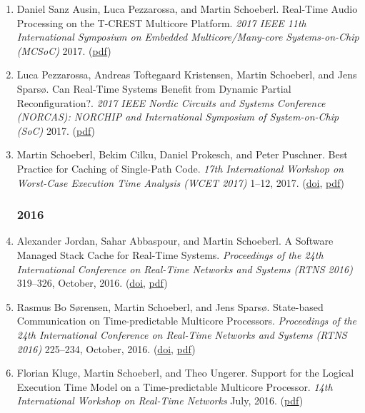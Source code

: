 \begin{enumerate}
\item Daniel Sanz Ausin, Luca Pezzarossa, and Martin Schoeberl.
 Real-Time Audio Processing on the T-CREST Multicore Platform.
 \emph{2017 IEEE 11th International Symposium on Embedded Multicore/Many-core Systems-on-Chip (MCSoC)} 2017.
(\href{http://www.jopdesign.com/doc/dspapp.pdf}{pdf})

\item Luca Pezzarossa, Andreas Toftegaard Kristensen, Martin Schoeberl, and Jens Spars{\o}.
 Can Real-Time Systems Benefit from Dynamic Partial Reconfiguration?.
 \emph{2017 IEEE Nordic Circuits and Systems Conference (NORCAS): NORCHIP and International Symposium of System-on-Chip (SoC)} 2017.
(\href{http://www.jopdesign.com/doc/dpr-mcp.pdf}{pdf})

\item Martin Schoeberl, Bekim Cilku, Daniel Prokesch, and Peter Puschner.
 Best Practice for Caching of Single-Path Code.
 \emph{17th International Workshop on Worst-Case Execution Time Analysis (WCET 2017)} 1--12, 2017.
(\href{http://dx.doi.org/10.4230/OASIcs.WCET.2017.2}{doi}, \href{http://www.jopdesign.com/doc/spcaching.pdf}{pdf})


\subsubsection*{2016}

\item Alexander Jordan, Sahar Abbaspour, and Martin Schoeberl.
 A Software Managed Stack Cache for Real-Time Systems.
 \emph{Proceedings of the 24th International Conference on Real-Time Networks and Systems (RTNS 2016)} 319--326, October, 2016.
(\href{http://dx.doi.org/10.1145/2997465}{doi}, \href{http://www.jopdesign.com/doc/swscache.pdf}{pdf})

\item Rasmus Bo S{\o}rensen, Martin Schoeberl, and Jens Spars{\o}.
 State-based Communication on Time-predictable Multicore Processors.
 \emph{Proceedings of the 24th International Conference on Real-Time Networks and Systems (RTNS 2016)} 225--234, October, 2016.
(\href{http://dx.doi.org/10.1145/2997465}{doi}, \href{http://www.jopdesign.com/doc/state-com.pdf}{pdf})

\item Florian Kluge, Martin Schoeberl, and Theo Ungerer.
 Support for the Logical Execution Time Model on a Time-predictable Multicore Processor.
 \emph{14th International Workshop on Real-Time Networks} July, 2016.
(\href{http://www.jopdesign.com/doc/mossca-pat.pdf}{pdf})


\end{enumerate}
